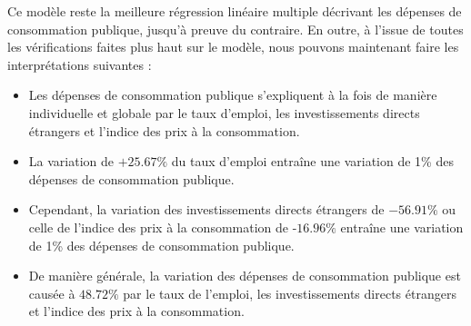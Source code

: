 \documentclass[a4paper, 12pt, openany]{book}
\begin{document}
Ce modèle reste la meilleure régression linéaire multiple décrivant les dépenses de consommation publique,
jusqu'à preuve du contraire. En outre, à l'issue de toutes les vérifications faites plus haut sur le modèle,
nous pouvons maintenant faire les interprétations suivantes :
\begin{itemize}[label=$\bullet$]
    \item Les dépenses de consommation publique s'expliquent à la fois de manière individuelle et globale par le taux d'emploi, les investissements directs étrangers et l'indice des prix à la consommation.
    \item La variation de $+25.67\%$ du taux d'emploi entraîne une variation de 1\% des dépenses de consommation publique.
    \item Cependant, la variation des investissements directs étrangers de $-56.91\%$ ou celle de l'indice des prix à la consommation de $‐16.96\%$ entraîne une variation de 1\% des dépenses de consommation publique.
    \item De manière générale, la variation des dépenses de consommation publique est causée à $48.72\%$ par le taux de l'emploi, les investissements directs étrangers et l'indice des prix à la consommation.
\end{itemize}
\end{document}

